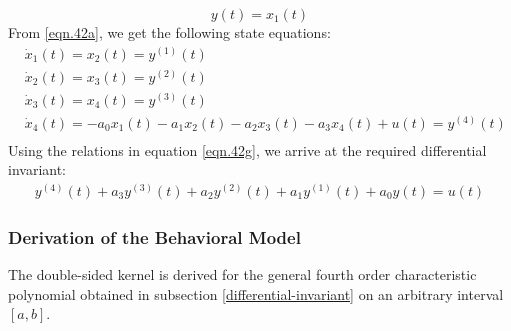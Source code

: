 \documentclass{article}
\begin{document}
\begin{equation*}\label{eqn.42f}
	y(t) = x_1(t)
\end{equation*}
From \eqref{eqn.42a}, we get the following state equations:
\begin{equation}\label{eqn.42g}
	\begin{split}
	&\dot{x}_{1}(t) = x_2(t) = y^{(1)}(t)\\
	&\dot{x}_{2}(t) = x_3(t) = y^{(2)}(t)\\
	&\dot{x}_{3}(t) = x_4(t) = y^{(3)}(t)\\
	&\dot{x}_{4}(t) = -a_0x_1(t)-a_1x_2(t)-a_2x_3(t)-a_3x_4(t)+u(t) = y^{(4)}(t)\\
	\end{split}
\end{equation}
Using the relations in equation \eqref{eqn.42g}, we arrive at the required differential invariant:
\begin{equation}\label{eqn.43}	
\begin{split}
	y^{(4)}(t) + a_{3}y^{(3)}(t) + a_{2} y^{(2)}(t) + a_{1}y^{(1)}(t) + a_{0}y(t) = u(t)
\end{split}
\end{equation}
\subsubsection{Derivation of the Behavioral Model}
The double-sided kernel is derived for the general fourth order characteristic polynomial obtained in subsection \ref{differential-invariant} on an arbitrary interval $[a, b]$.\\
\end{document}
